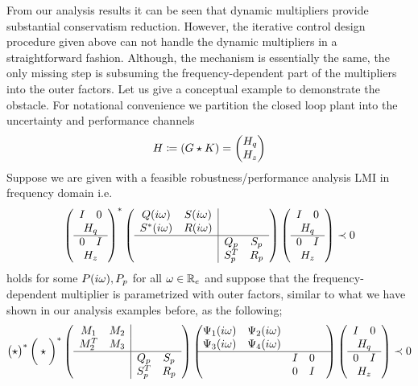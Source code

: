 From our analysis results it can be seen that dynamic multipliers provide substantial conservatism reduction. However,
the iterative control design procedure given above can not handle the dynamic multipliers in a straightforward 
fashion. Although, the mechanism is essentially the same, the only missing step is subsuming the frequency-dependent
part of the multipliers into the outer factors. Let us give a conceptual example to demonstrate the obstacle. For
notational convenience we partition the closed loop plant into the uncertainty and performance channels
\[
H \coloneqq (G\star K) = \begin{pmatrix}H_q\\H_z\end{pmatrix}
\]
Suppose we are given with a feasible robustness/performance analysis LMI in frequency domain i.e.
\[
\left(
\begin{array}{cc}
	I &0\\
	\multicolumn{2}{c}{H_q}\\\hline
	0& I\\
	\multicolumn{2}{c}{H_z}
\end{array}
\right)^*
\left(
\begin{array}{cc|cc}
Q(\iw)&S(\iw)&&\\S^*(\iw)&R(\iw)&&\\\hline &&Q_p&S_p\\&&S_p^T&R_p
\end{array}
\right)
\left(
\begin{array}{cc}
	I &0\\
	\multicolumn{2}{c}{H_q}\\\hline
	0& I\\
	\multicolumn{2}{c}{H_z}
\end{array}
\right) \prec 0
\]
holds for some $P(i\omega),P_p$ for all $\omega\in\mathbb{R}_e$ and suppose that the frequency-dependent multiplier is parametrized with 
outer factors, similar to what we have shown in our analysis examples before, as the following;
\[
\pmatr{\star}^*
\bigg(
\star
\bigg)^*
\left(
\begin{array}{cc|cc}
M_1&M_2&&\\M^T_2&M_3&&\\\hline &&Q_p&S_p\\&&S_p^T&R_p
\end{array}
\right)
\pmatr{\Psi_1(\iw)&\Psi_2(\iw)&&\\ \Psi_3(\iw)&\Psi_4(\iw)&&&\\\hline &&I&0\\&&0&I}
\left(
\begin{array}{cc}
	I &0\\
	\multicolumn{2}{c}{H_q}\\\hline
	0& I\\
	\multicolumn{2}{c}{H_z}
\end{array}
\right)
\prec 0
\]
